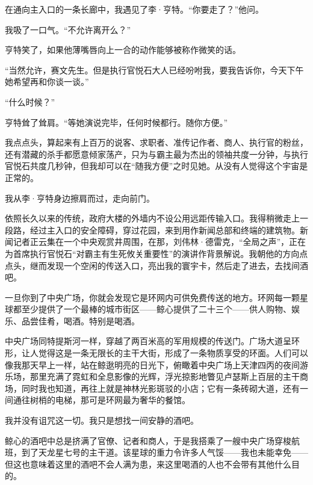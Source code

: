\documentclass[AutoFakeBold=true]{book}
\begin{document}
\vspace*{1em}

在通向主入口的一条长廊中，我遇见了李·亨特。``你要走了？''他问。

我吸了一口气。``不允许离开么？''

亨特笑了，如果他薄嘴唇向上一合的动作能够被称作微笑的话。

``当然允许，赛文先生。但是执行官悦石大人已经吩咐我，要我告诉你，今天下午她希望再和你谈一谈。''

``什么时候？''

亨特耸了耸肩。``等她演说完毕，任何时候都行。随你方便。''

我点点头，算起来有上百万的说客、求职者、准传记作者、商人、执行官的粉丝，还有潜藏的杀手都愿意倾家荡产，只为与霸主最为杰出的领袖共度一分钟，与执行官悦石共度几秒钟，但我却可以在``随我方便''之时见她。从没有人觉得这个宇宙是正常的。

我从李·亨特身边擦肩而过，走向前门。

\vspace*{1em}

依照长久以来的传统，政府大楼的外墙内不设公用远距传输入口。我得稍微走上一段路，经过主入口的安全障碍，穿过花园，来到用作新闻总部和终端的建筑物。新闻记者正云集在一个中央观赏井周围，在那，刘伟林·德雷克，``全局之声''，正在为首席执行官悦石``对霸主有生死攸关重要性''的演讲作背景解说。我朝他的方向点点头，继而发现一个空闲的传送入口，亮出我的寰宇卡，然后走了进去，去找间酒吧。

\vspace*{1em}

一旦你到了中央广场，你就会发现它是环网内可供免费传送的地方。环网每一颗星球都至少提供了一个最棒的城市街区——鲸心提供了二十三个——供人购物、娱乐、品尝佳肴，喝酒。特别是喝酒。

中央广场同特提斯河一样，穿越了两百米高的军用规模的传送门。广场大道呈环形，让人觉得这是一条无限长的主干大街，形成了一条物质享受的环面。人们可以像我那天早上一样，站在鲸逖明亮的日光下，俯瞰着中央广场上天津四丙的夜间游乐场，那里充满了霓虹和全息影像的光辉，浮光掠影地瞥见卢瑟斯上百层的主干商场，同时我也知道，再往上就是神林光影斑驳的小店；它有一条砖砌大道，还有一间通往树梢的电梯，那可是环网最为奢华的餐馆。

我并没有诅咒这一切。我只是想找一间安静的酒吧。

鲸心的酒吧中总是挤满了官僚、记者和商人，于是我搭乘了一艘中央广场穿梭航班，到了天龙星七号的主干道。该星球的重力令许多人气馁——我也未能幸免——但这也意味着这里的酒吧不会人满为患，来这里喝酒的人也不会带有其他什么目的。
\end{document}
